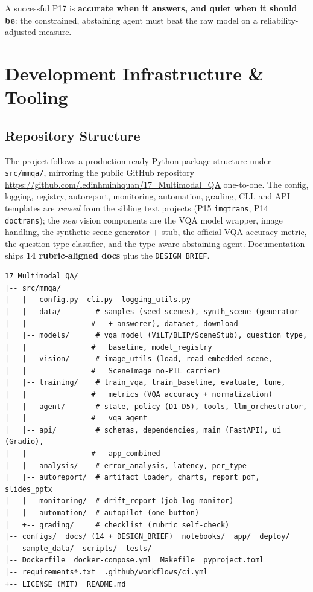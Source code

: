 \documentclass[12pt,a4paper]{article}
\begin{document}
A successful P17 is \textbf{accurate when it answers, and quiet when it should be}: the constrained, abstaining agent must beat the raw model on a reliability-adjusted measure.

\section{Development Infrastructure \& Tooling}

\subsection{Repository Structure}

The project follows a production-ready Python package structure under \texttt{src/mmqa/}, mirroring the public GitHub repository \url{https://github.com/ledinhminhquan/17_Multimodal_QA} one-to-one. The config, logging, registry, autoreport, monitoring, automation, grading, CLI, and API templates are \emph{reused} from the sibling text projects (P15 \texttt{imgtrans}, P14 \texttt{doctrans}); the \emph{new} vision components are the VQA model wrapper, image handling, the synthetic-scene generator $+$ stub, the official VQA-accuracy metric, the question-type classifier, and the type-aware abstaining agent. Documentation ships \textbf{14 rubric-aligned docs} plus the \texttt{DESIGN\_BRIEF}.

\begin{lstlisting}[basicstyle=\ttfamily\footnotesize]
17_Multimodal_QA/
|-- src/mmqa/
|   |-- config.py  cli.py  logging_utils.py
|   |-- data/        # samples (seed scenes), synth_scene (generator
|   |               #   + answerer), dataset, download
|   |-- models/      # vqa_model (ViLT/BLIP/SceneStub), question_type,
|   |               #   baseline, model_registry
|   |-- vision/      # image_utils (load, read embedded scene,
|   |               #   SceneImage no-PIL carrier)
|   |-- training/    # train_vqa, train_baseline, evaluate, tune,
|   |               #   metrics (VQA accuracy + normalization)
|   |-- agent/       # state, policy (D1-D5), tools, llm_orchestrator,
|   |               #   vqa_agent
|   |-- api/         # schemas, dependencies, main (FastAPI), ui (Gradio),
|   |               #   app_combined
|   |-- analysis/    # error_analysis, latency, per_type
|   |-- autoreport/  # artifact_loader, charts, report_pdf, slides_pptx
|   |-- monitoring/  # drift_report (job-log monitor)
|   |-- automation/  # autopilot (one button)
|   +-- grading/     # checklist (rubric self-check)
|-- configs/  docs/ (14 + DESIGN_BRIEF)  notebooks/  app/  deploy/
|-- sample_data/  scripts/  tests/
|-- Dockerfile  docker-compose.yml  Makefile  pyproject.toml
|-- requirements*.txt  .github/workflows/ci.yml
+-- LICENSE (MIT)  README.md
\end{lstlisting}
\end{document}
